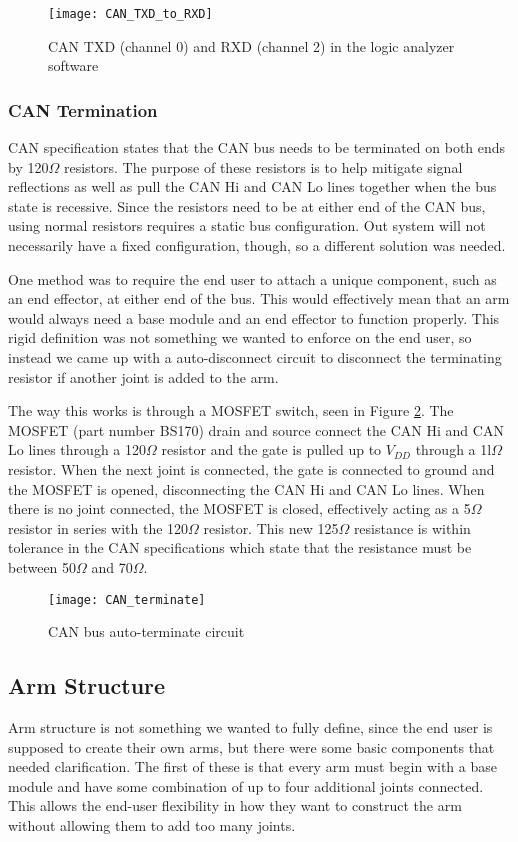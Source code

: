 \begin{figure}[H]
	\centering
	\texttt{[image: CAN\_TXD\_to\_RXD]}
	\caption{CAN TXD (channel 0) and RXD (channel 2) in the logic analyzer software}
	\label{fig:can_TXD_RXD}
\end{figure}

\subsubsection{CAN Termination}
CAN specification states that the CAN bus needs to be terminated on both ends by 120$\Omega$ resistors. The purpose of these resistors is to help mitigate signal reflections as well as pull the CAN Hi and CAN Lo lines together when the bus state is recessive. Since the resistors need to be at either end of the CAN bus, using normal resistors requires a static bus configuration. Out system will not necessarily have a fixed configuration, though, so a different solution was needed.

\noindent One method was to require the end user to attach a unique component, such as an end effector, at either end of the bus. This would effectively mean that an arm would always need a base module and an end effector to function properly. This rigid definition was not something we wanted to enforce on the end user, so instead we came up with a auto-disconnect circuit to disconnect the terminating resistor if another joint is added to the arm.

\noindent The way this works is through a MOSFET switch, seen in Figure \ref{fig:can_terminate_circ}. The MOSFET (part number BS170) drain and source connect the CAN Hi and CAN Lo lines through a 120$\Omega$ resistor and the gate is pulled up to $V_{DD}$ through a 1l$\Omega$ resistor. When the next joint is connected, the gate is connected to ground and the MOSFET is opened, disconnecting the CAN Hi and CAN Lo lines. When there is no joint connected, the MOSFET is closed, effectively acting as a 5$\Omega$ resistor in series with the 120$\Omega$ resistor. This new 125$\Omega$ resistance is within tolerance in the CAN specifications which state that the resistance must be between 50$\Omega$ and 70$\Omega$.

\begin{figure}[H]
	\centering
	\texttt{[image: CAN\_terminate]}
	\caption{CAN bus auto-terminate circuit}
	\label{fig:can_terminate_circ}
\end{figure}

\subsection{Arm Structure}
Arm structure is not something we wanted to fully define, since the end user is supposed to create their own arms, but there were some basic components that needed clarification. The first of these is that every arm must begin with a base module and have some combination of up to four additional joints connected.  This allows the end-user flexibility in how they want to construct the arm without allowing them to add too many joints.

